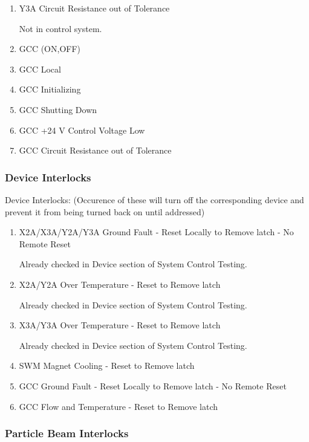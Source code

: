 \documentclass[11pt]{book}		%
\begin{document}
\begin{enumerate}
 \item Y3A Circuit Resistance out of Tolerance

\color{red}
Not in control system.
\color{black}

 \item GCC (ON,OFF)
 \item GCC Local
 \item GCC Initializing
 \item GCC Shutting Down
 \item GCC +24 V Control Voltage Low
 \item GCC Circuit Resistance out of Tolerance
\end{enumerate}

\subsubsection{Device Interlocks}\label{sect:cyc-op-interface-status-beamline-fc1totarget-state-monitors-device-interlocks}

Device Interlocks:
(Occurence of these will turn off the corresponding device and prevent it from being turned back on until addressed)

\begin{enumerate}
 \item X2A/X3A/Y2A/Y3A Ground Fault - Reset Locally to Remove latch - No Remote Reset

\color{red}
Already checked in Device section of System Control Testing.
\color{black}

 \item X2A/Y2A Over Temperature - Reset to Remove latch

\color{red}
Already checked in Device section of System Control Testing.
\color{black}

 \item X3A/Y3A Over Temperature - Reset to Remove latch

\color{red}
Already checked in Device section of System Control Testing.
\color{black}

 \item SWM Magnet Cooling - Reset to Remove latch
 \item GCC Ground Fault - Reset Locally to Remove latch - No Remote Reset
 \item GCC Flow and Temperature - Reset to Remove latch
\end{enumerate}

\subsubsection{Particle Beam Interlocks}\label{sect:cyc-op-interface-status-beamline-fc1totarget-state-monitors-beam-interlocks}
\end{document}

